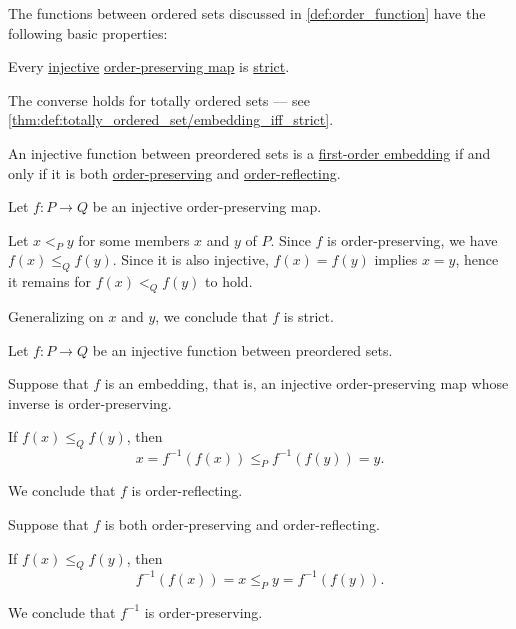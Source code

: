 \begin{proposition}\label{thm:def:order_function}
  The functions between ordered sets discussed in \cref{def:order_function} have the following basic properties:
  \begin{thmenum}
     Every \hyperref[def:function_invertibility/injective]{injective} \hyperref[def:order_function/preserving]{order-preserving map} is \hyperref[def:order_function/preserving]{strict}.

    The converse holds for totally ordered sets --- see \cref{thm:def:totally_ordered_set/embedding_iff_strict}.

     An injective function between preordered sets is a \hyperref[def:first_order_embedding]{first-order embedding} if and only if it is both \hyperref[def:order_function/preserving]{order-preserving} and \hyperref[def:order_function/preserving]{order-reflecting}.
  \end{thmenum}
\end{proposition}
\begin{defproof}
   Let \( f: P \to Q \) be an injective order-preserving map.

  Let \( x <_P y \) for some members \( x \) and \( y \) of \( P \). Since \( f \) is order-preserving, we have \( f(x) \leq_Q f(y) \). Since it is also injective, \( f(x) = f(y) \) implies \( x = y \), hence it remains for \( f(x) <_Q f(y) \) to hold.

  Generalizing on \( x \) and \( y \), we conclude that \( f \) is strict.

   Let \( f: P \to Q \) be an injective function between preordered sets.

  \SufficiencySubProof* Suppose that \( f \) is an embedding, that is, an injective order-preserving map whose inverse is order-preserving.

  If \( f(x) \leq_Q f(y) \), then
  \begin{equation*}
    x = f^{-1}(f(x)) \leq_P f^{-1}(f(y)) = y.
  \end{equation*}

  We conclude that \( f \) is order-reflecting.

  \NecessitySubProof* Suppose that \( f \) is both order-preserving and order-reflecting.

  If \( f(x) \leq_Q f(y) \), then
  \begin{equation*}
    f^{-1}(f(x)) = x \leq_P y = f^{-1}(f(y)).
  \end{equation*}

  We conclude that \( f^{-1} \) is order-preserving.
\end{defproof}
